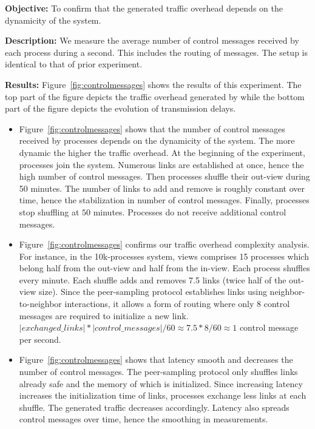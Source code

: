 \noindent \textbf{Objective:} To confirm that the generated traffic overhead
depends on the dynamicity of the system.

\noindent \textbf{Description:} We measure the average number of control
messages received by each process during a second. This includes the routing of
messages. The setup is identical to that of prior experiment.

\noindent \textbf{Results:} Figure~\ref{fig:controlmessages} shows the results of
this experiment. The top part of the figure depicts the traffic overhead
generated by \RPCBROADCAST while the bottom part of the figure depicts the
evolution of transmission delays.

\begin{itemize}
\item Figure~\ref{fig:controlmessages} shows that the number of control messages
  received by processes depends on the dynamicity of the system. The more
  dynamic the higher the traffic overhead. At the beginning of the experiment,
  processes join the system. Numerous links are established at once, hence the
  high number of control messages. Then processes shuffle their out-view during
  50 minutes. The number of links to add and remove is roughly constant over
  time, hence the stabilization in number of control messages. Finally,
  processes stop shuffling at $50$ minutes. Processes do not receive additional
  control messages.
\item Figure~\ref{fig:controlmessages} confirms our traffic overhead complexity
  analysis. For instance, in the 10k-processes system, views comprises 15
  processes which belong half from the out-view and half from the in-view.  Each
  process shuffles every minute. Each shuffle adds and removes 7.5 links (twice
  half of the out-view size). Since the peer-sampling protocol establishes links
  using neighbor-to-neighbor interactions, it allows a form of routing where
  only 8 control messages are required to initialize a new link.
  $|exchanged\_links|*|control\_messages|/60 \approx 7.5*8/60 \approx 1$ control
  message per second.
\item Figure~\ref{fig:controlmessages} shows that latency smooth and decreases
  the number of control messages. The peer-sampling protocol only shuffles links
  already safe and the memory of which is initialized. Since increasing latency
  increases the initialization time of links, processes exchange less links at
  each shuffle. The generated traffic decreases accordingly. Latency also
  spreads control messages over time, hence the smoothing in measurements.
\end{itemize}

